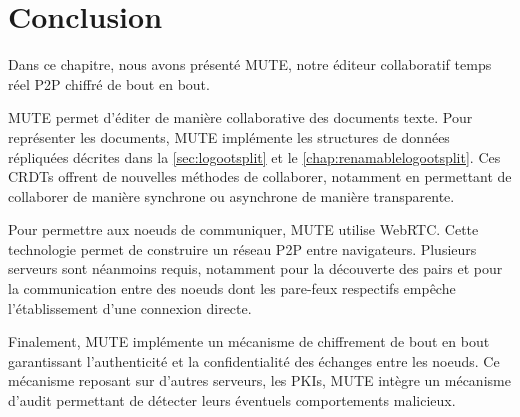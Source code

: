 
\section{Conclusion}

Dans ce chapitre, nous avons présenté \acf{MUTE}, notre éditeur collaboratif temps réel \ac{P2P} chiffré de bout en bout.

MUTE permet d'éditer de manière collaborative des documents texte.
Pour représenter les documents, MUTE implémente les structures de données répliquées décrites dans la \autoref{sec:logootsplit} et le \autoref{chap:renamablelogootsplit}.
Ces \acp{CRDT} offrent de nouvelles méthodes de collaborer, notamment en permettant de collaborer de manière synchrone ou asynchrone de manière transparente.

Pour permettre aux noeuds de communiquer, MUTE utilise WebRTC.
Cette technologie permet de construire un réseau \ac{P2P} entre navigateurs.
Plusieurs serveurs sont néanmoins requis, notamment pour la découverte des pairs et pour la communication entre des noeuds dont les pare-feux respectifs empêche l'établissement d'une connexion directe.

Finalement, MUTE implémente un mécanisme de chiffrement de bout en bout garantissant l'authenticité et la confidentialité des échanges entre les noeuds.
Ce mécanisme reposant sur d'autres serveurs, les PKIs, MUTE intègre un mécanisme d'audit permettant de détecter leurs éventuels comportements malicieux.
